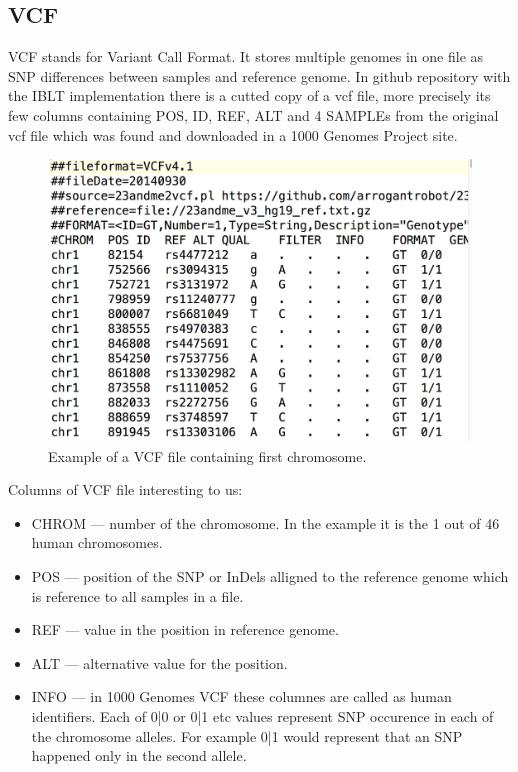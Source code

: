 \documentclass{article}
\begin{document}
\subsection{VCF}
VCF stands for Variant Call Format. It stores multiple genomes in one file as 
SNP differences between samples and reference genome. 
In github repository with the IBLT implementation there is a cutted copy of a
vcf file, more precisely its few columns containing POS, ID, REF, ALT and 4 SAMPLEs 
from the original vcf file which was found and downloaded in a 1000 Genomes 
Project \textcite{genomes} site.
\begin{figure}[h]
\centering
\includegraphics[scale=0.25]{./vcf_format.jpg}
\caption{Example of a VCF file containing first chromosome.
}
\end{figure}
Columns of VCF file interesting to us:
\begin{itemize}
    \item CHROM --- number of the chromosome. In the example it is the 1 out
        of 46 human chromosomes.
    \item POS --- position of the SNP or InDels alligned to the reference genome
        which is reference to all samples in a file.
    \item REF --- value in the position in reference genome.
    \item ALT --- alternative value for the position.
    \item INFO --- in 1000 Genomes VCF these columnes are called as human 
        identifiers. Each of 0|0 or 0|1 etc values represent SNP occurence in 
        each of the chromosome alleles. For example 0|1 would represent that 
        an SNP happened only in the second allele.   
\end{itemize}
\end{document}
